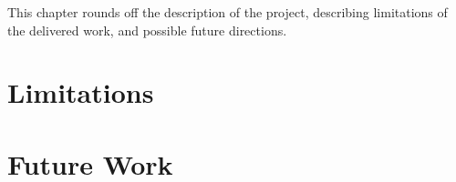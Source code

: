 This chapter rounds off the description of the project, describing limitations of the delivered work, and possible future directions.

\section{Limitations}

\section{Future Work}

